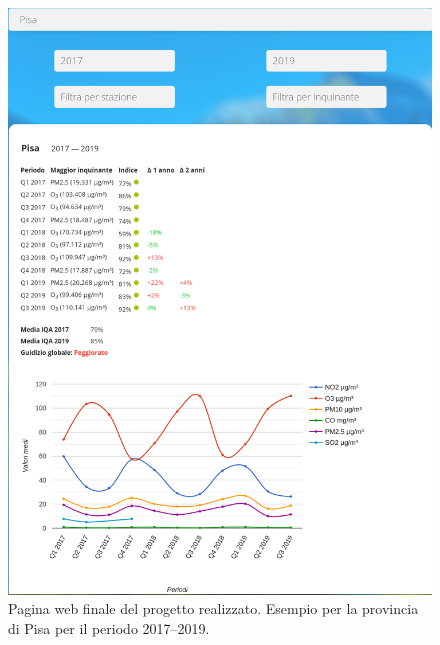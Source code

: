 \begin{figure}[p]
	\centering
	\includegraphics[width=\textwidth]{img/final-result}
	\caption{Pagina web finale del progetto realizzato. Esempio per la
	provincia di Pisa per il periodo 2017--2019.}\label{fig:finalresult}
\end{figure}
